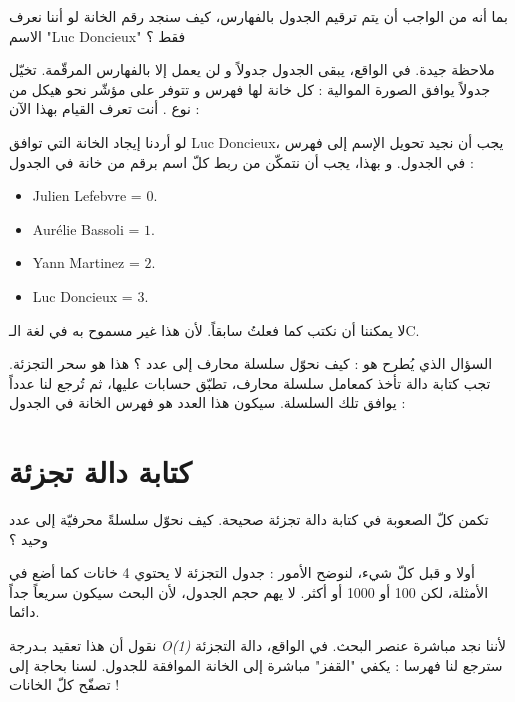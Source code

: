 \begin{question}
بما أنه من الواجب أن يتم ترقيم الجدول بالفهارس، كيف سنجد رقم الخانة لو أننا نعرف الاسم
"\textenglish{Luc Doncieux}"
 فقط ؟
\end{question}

ملاحظة جيدة. في الواقع، يبقى الجدول جدولاً و لن يعمل إلا بالفهارس المرقّمة. تخيّل جدولاً يوافق الصورة الموالية : كل خانة لها فهرس و تتوفر على مؤشّر نحو هيكل من نوع
.
أنت تعرف القيام بهذا الآن :


 لو أردنا إيجاد الخانة التي توافق
\textenglish{Luc Doncieux}،
 يجب أن نجيد تحويل الإسم إلى فهرس في الجدول. و بهذا، يجب أن نتمكّن من ربط كلّ اسم برقم من خانة في الجدول :

\begin{itemize}
	\item \textenglish{Julien Lefebvre} = $0$.
	\item \textenglish{Aurélie Bassoli} = $1$.
	\item \textenglish{Yann Martinez} = $2$.
	\item \textenglish{Luc Doncieux} = $3$.
\end{itemize}

لا يمكننا أن نكتب
كما فعلتُ سابقاً. لأن هذا غير مسموح به في لغة الـ\textenglish{C}.

السؤال الذي يُطرح هو : كيف نحوّل سلسلة محارف إلى عدد ؟ هذا هو سحر التجزئة. تجب كتابة دالة تأخذ كمعامل سلسلة محارف، تطبّق حسابات عليها، ثم تُرجع لنا عدداً يوافق تلك السلسلة. سيكون هذا العدد هو فهرس الخانة في الجدول :


\section{كتابة دالة تجزئة}

تكمن كلّ الصعوبة في كتابة دالة تجزئة صحيحة. كيف نحوّل سلسلةً محرفيّة إلى عدد وحيد ؟

أولا و قبل كلّ شيء، لنوضح الأمور : جدول التجزئة لا يحتوي 4 خانات كما أضع في الأمثلة، لكن 100 أو 1000 أو أكثر. لا يهم حجم الجدول، لأن البحث سيكون سريعاً جداً دائما.

\begin{information}
نقول أن هذا تعقيد بـدرجة
\textit{\textenglish{O(1)}}
لأننا نجد مباشرة عنصر البحث. في الواقع، دالة التجزئة سترجع لنا فهرسا : يكفي "القفز" مباشرة إلى الخانة الموافقة للجدول. لسنا بحاجة إلى تصفّح كلّ الخانات !
\end{information}

